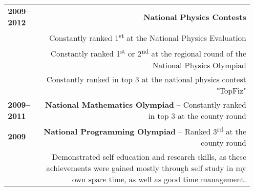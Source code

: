 \documentclass[11pt,a4paper]{article}
\begin{document}
\begin{tabular}{LR}
\bf 2009--2012&\bf National Physics Contests\\
&Constantly ranked 1\textsuperscript{st} at the National Physics Evaluation\\
&Constantly ranked 1\textsuperscript{st} or 2\textsuperscript{nd} at the regional round of the National Physics Olympiad\\
&Constantly ranked in top 3 at the national physics contest "TopFiz"\vspace{5pt}\\

\bf 2009--2011&{\bf National Mathematics Olympiad} -- Constantly ranked in top 3 at the county round\vspace{5pt}\\

\bf 2009&{\bf National Programming Olympiad} -- Ranked 3\textsuperscript{rd} at the county round\vspace{5pt}\\

&Demonstrated self education and research skills, as these achievements were gained mostly through self study in my own spare time, as well as good time management.\vspace{-2ex}\\ 
\end{tabular}
\end{document}
